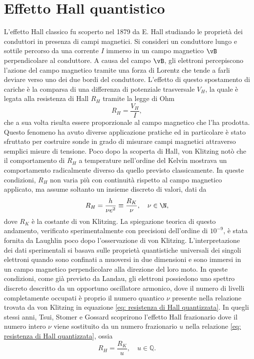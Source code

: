 \chapter{Effetto Hall quantistico}
L'effetto Hall classico fu scoperto nel 1879 da E. Hall studiando le proprietà dei conduttori in presenza di campi magnetici. Si consideri un conduttore lungo e sottile percorso da una corrente $I$ immerso in un campo magnetico $\vB$ perpendicolare al conduttore. A causa del campo $\vB$, gli elettroni percepiscono l'azione del campo magnetico tramite una forza di Lorentz che tende a farli deviare verso uno dei due bordi del conduttore. L'effetto di questo spostamento di cariche è la comparsa di una differenza di potenziale trasversale $V_H$, la quale è legata alla resistenza di Hall $R_H$ tramite la legge di Ohm
\begin{equation}
    R_H = \frac{V_H}{I},
\end{equation}
che a sua volta risulta essere proporzionale al campo magnetico che l'ha prodotta. Questo fenomeno ha avuto diverse applicazione pratiche ed in particolare è stato sfruttato per costruire sonde in grado di misurare campi magnetici attraverso semplici misure di tensione. Poco dopo la scoperta di Hall, von Klitzing notò che il comportamento di $R_H$ a temperature nell'ordine del Kelvin mostrava un comportamento radicalmente diverso da quello previsto classicamente. In queste condizioni, $R_H$ non varia più con continuità rispetto al campo magnetico applicato, ma assume soltanto un insieme discreto di valori, dati da
\begin{equation}
\label{eq: resistenza di Hall quantizzata}
    R_H = \frac{h}{\nu e^2} \equiv \frac{R_K}{\nu},\quad \nu \in \N,
\end{equation}
dove $R_K$ è la costante di von Klitzing. La spiegazione teorica di questo andamento, verificato sperimentalmente con precisioni dell'ordine di $10^{-9}$, è stata fornita da Laughlin poco dopo l'osservazione di von Klitzing. L'interpretazione dei dati sperimentali si basava sulle proprietà quantistiche universali dei singoli elettroni quando sono confinati a muoversi in due dimensioni e sono immersi in un campo magnetico perpendicolare alla direzione del loro moto. In queste condizioni, come già previsto da Landau, gli elettroni possiedono uno spettro discreto descritto da un opportuno oscillatore armonico, dove il numero di livelli completamente occupati è proprio il numero quantico $\nu$ presente nella relazione trovata da von Klitzing in equazione \eqref{eq: resistenza di Hall quantizzata}. In quegli stessi anni, Tsui, Stomer e Gossard scoprirono l'effetto Hall frazionario dove il numero intero $\nu$ viene sostituito da un numero frazionario $u$ nella relazione \eqref{eq: resistenza di Hall quantizzata}, ossia
\begin{equation}
    R_H = \frac{R_K}{u},\quad u \in \mathbb{Q}.
\end{equation}

